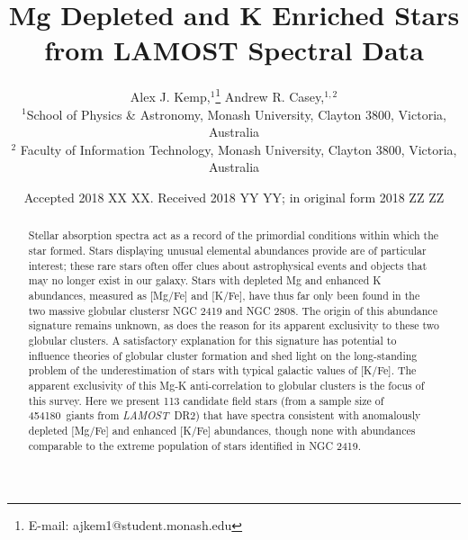 \documentclass[a4paper,fleqn,usenatbib]{mnras}
\title[Short title, max. 45 characters]{Mg Depleted and K Enriched Stars from LAMOST Spectral Data}
\author[Kemp et al.]{
Alex J. Kemp,$^{1}$\thanks{E-mail: ajkem1@student.monash.edu}
Andrew R. Casey,$^{1,2}$
\\
$^{1}$School of Physics \& Astronomy, Monash University, Clayton 3800, Victoria, Australia\\
$^{2}$ Faculty of Information Technology, Monash University, Clayton 3800, Victoria, Australia\\
}
\date{Accepted 2018 XX XX. Received 2018 YY YY; in original form 2018 ZZ ZZ}
\newcommand{\LamostGiants}{454180}
\newcommand{\project}[1]{\emph{#1}}
\newcommand{\lamost}{\project{LAMOST}}
\begin{document}
\label{firstpage}
\pagerange{\pageref{firstpage}--\pageref{lastpage}}
\maketitle

\begin{abstract}

Stellar absorption spectra act as a record of the primordial conditions within which the star formed. Stars displaying unusual elemental abundances provide are of particular interest; these rare stars often offer clues about astrophysical events and objects that may no longer exist in our galaxy. Stars with  depleted Mg and enhanced K abundances, measured as [Mg/Fe] and [K/Fe], have thus far only been found in the two massive globular clustersr NGC 2419 and NGC 2808. The origin of this abundance signature remains unknown, as does the reason for its apparent exclusivity to these two globular clusters. A satisfactory explanation for this signature has potential to influence theories of globular cluster formation and shed light on the long-standing problem of the underestimation of stars with typical galactic values of [K/Fe]. The apparent exclusivity of this Mg-K anti-correlation to globular clusters is the focus of this survey. Here we present 113 candidate field stars (from a sample size of \LamostGiants \ giants from \lamost \ DR2) that have spectra consistent with anomalously depleted [Mg/Fe] and enhanced [K/Fe] abundances, though none with abundances comparable to the extreme population of stars identified in NGC 2419.


\end{abstract}
\end{document}
